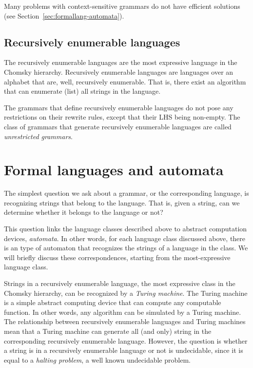 Many problems with context-sensitive grammars do not have
efficient solutions (see Section~\ref{sec:formallang-automata}).

\subsection{Recursively enumerable languages}

The recursively enumerable languages are the most expressive language
in the Chomsky hierarchy.
Recursively enumerable languages are languages over an alphabet that are,
well, recursively enumerable.
That is, there exist an algorithm that can enumerate (list)
all strings in the language.

The grammars that define recursively enumerable languages
do not pose any restrictions on their rewrite rules,
except that their LHS being non-empty.
The class of grammars that generate recursively enumerable languages
are called \emph{unrestricted grammars}.

\section{\label{sec:formallang-automata}Formal languages and automata}

The simplest question we ask about a grammar,
or the corresponding language,
is recognizing strings that belong to the language.
That is, given a string,
can we determine whether it belongs to the language or not?

This question links the language classes described above to
abstract computation devices, \emph{automata}.
In other words,
for each language class discussed above,
there is an type of automaton that recognizes the strings of
a language in the class.
We will briefly discuss these correspondences,
starting from the most-expressive language class.

Strings in a recursively enumerable language,
the most expressive class in the Chomsky hierarchy,
can be recognized by a \emph{Turing machine}.
The Turing machine is a simple abstract computing device
that can compute any computable function.
In other words, any algorithm can be simulated by a Turing machine.
The relationship between recursively enumerable languages
and Turing machines mean
that a Turing machine can generate all (and only) string
in the corresponding recursively enumerable language.
However, the question is whether a string is in
a recursively enumerable language or not is undecidable,
since it is equal to a \emph{halting problem},
a well known undecidable problem.

